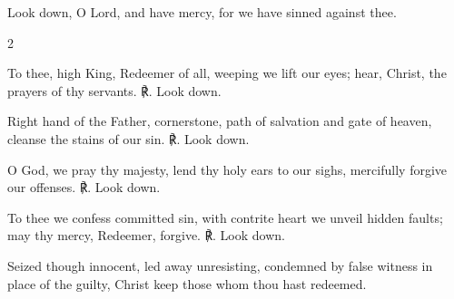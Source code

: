 \begin{enpars} \noindent 
Look down, O Lord, and have mercy, for we have sinned against thee.
\end{enpars}

\begin{multicols}{2}
\raggedcolumns
\begin{enpars}
To thee, high King, Redeemer of all, weeping we lift our eyes; hear, Christ, the
prayers of thy servants. ℟. Look down.

Right hand of the Father, cornerstone, path of salvation and gate of heaven,
cleanse the stains of our sin. ℟. Look down.

O God, we pray thy majesty, lend thy holy ears to our sighs, mercifully forgive
our offenses. ℟. Look down.

To thee we confess committed sin, with contrite heart we unveil hidden faults;
may thy mercy, Redeemer, forgive. ℟. Look down.

Seized though innocent, led away unresisting, condemned by false witness in
place of the guilty, Christ keep those whom thou hast redeemed. 
\end{enpars}\end{multicols}